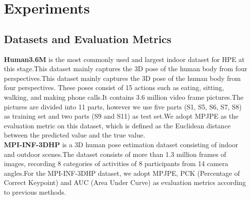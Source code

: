 \documentclass{article}
\begin{document}
\begin{table}[h]
\begin{center}
\caption{
Quantitative comparison with the state-of-the-art methods
on MPI-INF-3DHP.The best score is marked in bold.\\
}
\label{lab2}
\end{center}
\end{table}


\noindent			
\section{Experiments}
\subsection{Datasets and Evaluation Metrics}
\textbf{Human3.6M} is the most commonly used and largest indoor dataset for HPE at this stage.This dataset mainly captures the 3D pose of the human body from four perspectives.This dataset mainly captures the 3D pose of the human body from four perspectives. These poses consist of 15 actions such as eating, sitting, walking, and making phone calls.It contains 3.6 million video frame pictures.The pictures are divided into 11 parts, however we use five parts (S1, S5, S6, S7, S8) as training set and two parts (S9 and S11) as test set.We adopt MPJPE as the evaluation metric on this dataset, which is defined as the Euclidean distance between the predicted value and the true value.\\
\textbf{MPI-INF-3DHP} is a 3D human pose estimation dataset consisting of indoor and outdoor scenes.The dataset consists of more than 1.3 million frames of images, recording 8 categories of activities of 8 participants from 14 camera angles.For the MPI-INF-3DHP dataset, we adopt MPJPE, PCK (Percentage of Correct Keypoint) and AUC (Area Under Curve) as evaluation metrics according to previous methods.	
\end{document}

